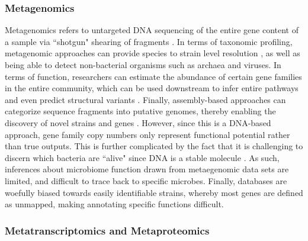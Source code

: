 \subsubsection{Metagenomics}
Metagenomics refers to untargeted DNA sequencing of the entire gene content of a sample via ``shotgun" shearing of fragments \cite{quince2017shotgun}. In terms of taxonomic profiling, metagenomic approaches can provide species to strain level resolution \cite{truong2015metaphlan2}, as well as being able to detect non-bacterial organisms such as archaea and viruses. In terms of function, researchers can estimate the abundance of certain gene families in the entire community, which can be used downstream to infer entire pathways and even predict structural variants \cite{kiefl2022structureinformed}. Finally, assembly-based approaches can categorize sequence fragments into putative genomes, thereby enabling the discovery of novel strains and genes \cite{perez-cobas2020metagenomic}. However, since this is a DNA-based approach, gene family copy numbers only represent functional potential rather than true outputs. This is further complicated by the fact that it is challenging to discern which bacteria are ``alive" since DNA is a stable molecule \cite{quince2017shotgun}. As such, inferences about microbiome function drawn from metaegenomic data sets are limited, and difficult to trace back to specific microbes. Finally, databases are woefully biased towards easily identifiable strains, whereby most genes are defined as unmapped, making annotating specific functions difficult. 

\subsubsection{Metatranscriptomics and Metaproteomics}

